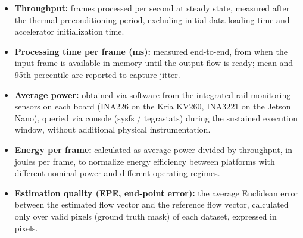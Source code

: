 \documentclass[conference]{IEEEtran}
\begin{document}
\begin{itemize}
    \item \textbf{Throughput:} frames processed per second at steady state, measured after the thermal preconditioning period, excluding initial data loading time and accelerator initialization time.

    \item \textbf{Processing time per frame (ms):} measured end-to-end, from when the input frame is available in memory until the output flow is ready; mean and 95th percentile are reported to capture jitter.

    \item \textbf{Average power:} obtained via software from the integrated rail monitoring sensors on each board (INA226 on the Kria KV260, INA3221 on the Jetson Nano), queried via console (sysfs / tegrastats) during the sustained execution window, without additional physical instrumentation.

    \item \textbf{Energy per frame:} calculated as average power divided by throughput, in joules per frame, to normalize energy efficiency between platforms with different nominal power and different operating regimes.

    \item \textbf{Estimation quality (EPE, end-point error):} the average Euclidean error between the estimated flow vector and the reference flow vector, calculated only over valid pixels (ground truth mask) of each dataset, expressed in pixels.
\end{itemize}
\end{document}
